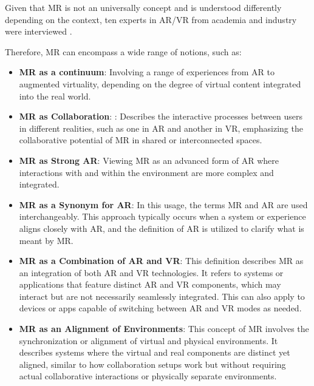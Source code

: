 \begin{itemize}
    Given that \ac{MR} is not an universally concept and is understood differently depending on the context, ten experts in \ac{AR}/\ac{VR}
    from academia and industry were interviewed \cite{whatismixedreality}.

    Therefore, \ac{MR} can encompass a wide range of notions, such as:
    \begin{itemize}
        \item \textbf{\ac{MR} as a continuum}: Involving a range of experiences from \ac{AR} to augmented virtuality, depending on the degree of
        virtual content integrated into the real world.
        \item \textbf{\ac{MR} as Collaboration}: : Describes the interactive processes between users in different realities, such as one in \ac{AR}
        and another in \ac{VR}, emphasizing the collaborative potential of \ac{MR} in shared or interconnected spaces.
        \item \textbf{\ac{MR} as Strong \ac{AR}}: Viewing \ac{MR} as an advanced form of \ac{AR} where interactions with and within the environment are 
        more complex and integrated.
        \item \textbf{\ac{MR} as a Synonym for \ac{AR}}: In this usage, the terms \ac{MR} and \ac{AR} are used interchangeably.
        This approach typically occurs when a system or experience aligns closely with \ac{AR}, and the definition of \ac{AR} is utilized to clarify what is 
        meant by \ac{MR}.
        \item \textbf{\ac{MR} as a Combination of \ac{AR} and \ac{VR}}: This definition describes \ac{MR} as an integration of both \ac{AR} and \ac{VR} technologies. 
        It refers to systems or applications that feature distinct \ac{AR} and \ac{VR} components, which may interact but are not necessarily seamlessly integrated.
        This can also apply to devices or apps capable of switching between \ac{AR} and \ac{VR} modes as needed.
        \item \textbf{\ac{MR} as an Alignment of Environments}: This concept of \ac{MR} involves the synchronization or alignment of virtual and physical 
        environments. It describes systems where the virtual and real components are distinct yet aligned, similar to how collaboration setups 
        work but without requiring actual collaborative interactions or physically separate environments.
    \end{itemize}
\end{itemize}

